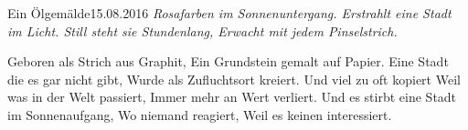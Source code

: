 \begin{poem}{Ein Ölgemälde}{15.08.2016}
\emph{Rosafarben im Sonnenuntergang.
Erstrahlt eine Stadt im Licht.
Still steht sie Stundenlang,
Erwacht mit jedem Pinselstrich.}

Geboren als Strich aus Graphit,
Ein Grundstein gemalt auf Papier.
Eine Stadt die es gar nicht gibt,
Wurde als Zufluchtsort kreiert.
Und viel zu oft kopiert
Weil was in der Welt passiert,
Immer mehr an Wert verliert.
Und es stirbt eine Stadt im Sonnenaufgang,
Wo niemand reagiert,
Weil es keinen interessiert.
\end{poem}